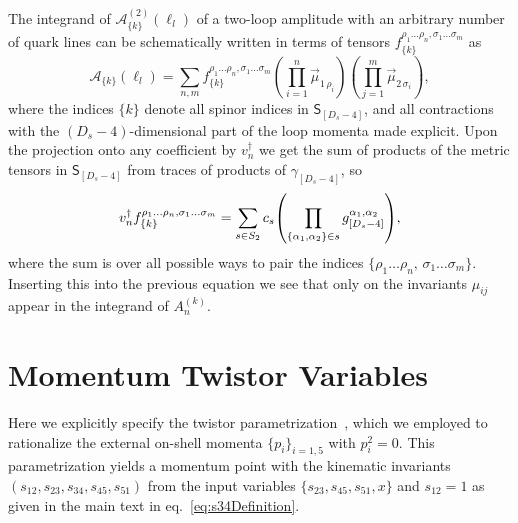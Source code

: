 
The integrand of $\mathcal{A}^{(2)}_{\{k\}}(\ell_l)$ of a two-loop amplitude with an arbitrary
number of quark lines can be schematically written in terms of tensors $f^{\rho_1 \ldots \rho_n, \sigma_1\ldots \sigma_m}_{\{k\}}$ as
\begin{equation} 
  \mathcal{A}_{\{k\}}(\ell_l) = \sum_{n,m} f^{\rho_1 \ldots \rho_n, \sigma_1 \ldots \sigma_m}_{\{k\}}
  \left(\prod_{i=1}^n \vec{\mu}_{1 \, \rho_i}\right)
  \left(\prod_{j=1}^m \vec{\mu}_{2 \, \sigma_i}\right),
\end{equation}
where the indices $\{k\}$ denote all spinor indices in  $\mathsf{S}_{[D_s-4]}$,
and all contractions with the $(D_s-4)$-dimensional part of the loop momenta made explicit.
Upon the projection onto any coefficient by $v_n^\dagger$ we get the sum of products of the metric tensors in $\mathsf{S}_{[D_s-4]}$
from traces of products of $\gamma_{[D_s-4]}$, so 
\begin{equation}
  v_n^\dagger f^{\rho_1 \ldots \rho_n, \sigma_1 \ldots \sigma_m}_{\{k\}}  = \sum_{s\in S_2} c_s \qty(\prod_{\{\alpha_1,\alpha_2\}\in s} g^{\alpha_1,\alpha_2}_{[D_s-4]}),
\end{equation}
where the sum is over all possible ways to pair the indices $\{ \rho_1 \ldots \rho_n,\,\sigma_1 \ldots \sigma_m \}$.
Inserting this into the previous equation we see that only on the invariants $\mu_{ij}$ appear in the integrand of $A_n^{(k)}$.



\chapter{Momentum Twistor Variables}
\label{sec:twistors}

Here we explicitly specify the twistor parametrization~\cite{Hodges:2009hk}, which
we employed to rationalize the external on-shell momenta $\{p_i\}_{i=1,5}$ with
$p_i^2=0$. This parametrization yields a momentum point with the
kinematic invariants $(s_{12}, s_{23}, s_{34}, s_{45}, s_{51})$ from the
input variables $\{ s_{23}, s_{45}, s_{51}, x \}$ and $s_{12}=1$ 
as given in the main text in eq.~\eqref{eq:s34Definition}.

